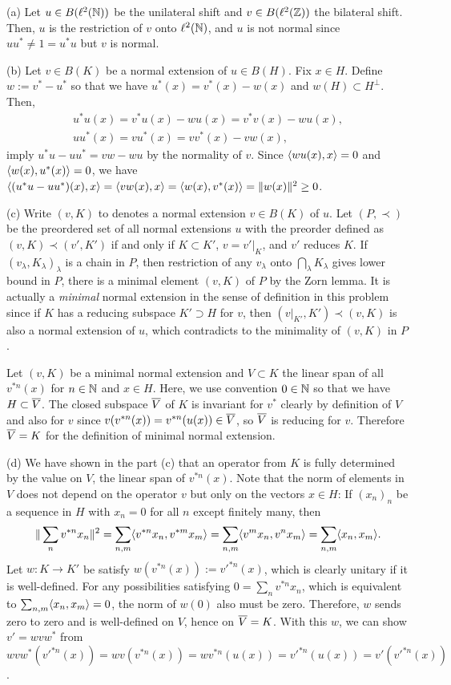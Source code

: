 \documentclass{../solution}
\begin{document}
\begin{sol}
(a)
Let $u\in B(\ell^2(\mathbb{N}))$ be the unilateral shift and $v\in B(\ell^2(\mathbb{Z}))$ the bilateral shift.
Then, $u$ is the restriction of $v$ onto $\ell^2(\mathbb{N})$, and $u$ is not normal since $uu^*\ne1=u^*u$ but $v$ is normal.

(b)
Let $v\in B(K)$ be a normal extension of $u\in B(H)$.
Fix $x\in H$.
Define $w:=v^*-u^*$ so that we have $u^*(x)=v^*(x)-w(x)$ and $w(H)\subset H^\perp$.
Then,
\begin{gather*}
u^*u(x)=v^*u(x)-wu(x)=v^*v(x)-wu(x),\\
uu^*(x)=vu^*(x)=vv^*(x)-vw(x),
\end{gather*}
imply $u^*u-uu^*=vw-wu$ by the normality of $v$.
Since $\langle wu(x),x\rangle=0$ and $\langle w(x),u^*(x)\rangle=0$, we have $\langle(u^*u-uu^*)(x),x\rangle=\langle vw(x),x\rangle=\langle w(x),v^*(x)\rangle=\|w(x)\|^2\ge0$.

(c)
Write $(v,K)$ to denotes a normal extension $v\in B(K)$ of $u$.
Let $(P,\prec)$ be the preordered set of all normal extensions $u$ with the preorder defined as $(v,K)\prec(v',K')$ if and only if $K\subset K'$, $v=v'|_K$, and $v'$ reduces $K$.
If $(v_\lambda,K_\lambda)_\lambda$ is a chain in $P$, then restriction of any $v_\lambda$ onto $\bigcap_\lambda K_\lambda$ gives lower bound in $P$, there is a minimal element $(v,K)$ of $P$ by the Zorn lemma.
It is actually a \emph{minimal} normal extension in the sense of definition in this problem since if $K$ has a reducing subspace $K'\supset H$ for $v$, then $(v|_{K'},K')\prec(v,K)$ is also a normal extension of $u$, which contradicts to the minimality of $(v,K)$ in $P$.

Let $(v,K)$ be a minimal normal extension and $V\subset K$ the linear span of all $v^{*n}(x)$ for $n\in\mathbb{N}$ and $x\in H$.
Here, we use convention $0\in\mathbb{N}$ so that we have $H\subset\overline V$.
The closed subspace $\overline V$ of $K$ is invariant for $v^*$ clearly by definition of $V$ and also for $v$ since $v(v^{*n}(x))=v^{*n}(u(x))\in \overline V$, so $\overline V$ is reducing for $v$.
Therefore $\overline V=K$ for the definition of minimal normal extension.

(d)
We have shown in the part (c) that an operator from $K$ is fully determined by the value on $V$, the linear span of $v^{*n}(x)$.
Note that the norm of elements in $V$ does not depend on the operator $v$ but only on the vectors $x\in H$:
If $(x_n)_n$ be a sequence in $H$ with $x_n=0$ for all $n$ except finitely many, then
\[\|\sum_n v^{*n}x_n\|^2
=\sum_{n,m}\langle v^{*n}x_n,v^{*m}x_m\rangle
=\sum_{n,m}\langle v^mx_n,v^nx_m\rangle
=\sum_{n,m}\langle x_n,x_m\rangle.\]
Let $w:K\to K'$ be satisfy $w(v^{*n}(x)):=v'^{*n}(x)$, which is clearly unitary if it is well-defined.
For any possibilities satisfying $0=\sum_nv^{*n}x_n$, which is equivalent to $\sum_{n,m}\langle x_n,x_m\rangle=0$, the norm of $w(0)$ also must be zero.
Therefore, $w$ sends zero to zero and is well-defined on $V$, hence on $\overline V=K$.
With this $w$, we can show $v'=wvw^*$ from $wvw^*(v'^{*n}(x))=wv(v^{*n}(x))=wv^{*n}(u(x))=v'^{*n}(u(x))=v'(v'^{*n}(x))$.
\end{sol}
\end{document}
